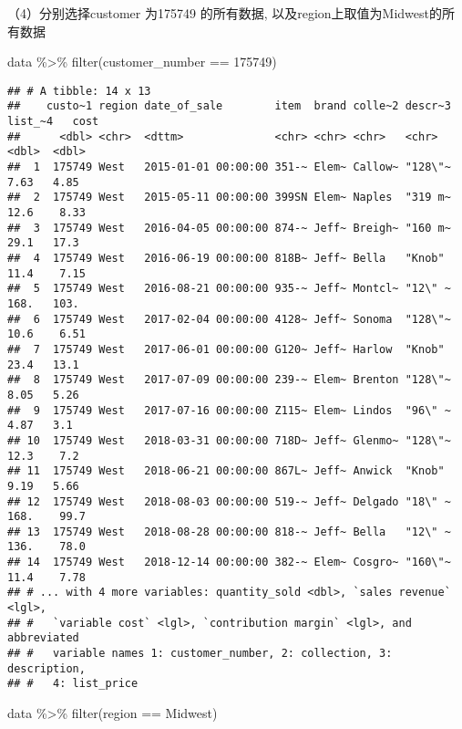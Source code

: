 \documentclass[
]{article}
\newenvironment{Shaded}{\begin{snugshade}}{\end{snugshade}}
\newcommand{\DecValTok}[1]{\textcolor[rgb]{0.00,0.00,0.81}{#1}}
\newcommand{\FunctionTok}[1]{\textcolor[rgb]{0.00,0.00,0.00}{#1}}
\newcommand{\NormalTok}[1]{#1}
\newcommand{\SpecialCharTok}[1]{\textcolor[rgb]{0.00,0.00,0.00}{#1}}
\newcommand{\StringTok}[1]{\textcolor[rgb]{0.31,0.60,0.02}{#1}}
\begin{document}
（4）分别选择customer 为175749 的所有数据,
以及region上取值为Midwest的所有数据

\begin{Shaded}
\begin{Highlighting}[]
\NormalTok{data }\SpecialCharTok{\%\textgreater{}\%}
  \FunctionTok{filter}\NormalTok{(customer\_number }\SpecialCharTok{==} \DecValTok{175749}\NormalTok{)}
\end{Highlighting}
\end{Shaded}

\begin{verbatim}
## # A tibble: 14 x 13
##    custo~1 region date_of_sale        item  brand colle~2 descr~3 list_~4   cost
##      <dbl> <chr>  <dttm>              <chr> <chr> <chr>   <chr>     <dbl>  <dbl>
##  1  175749 West   2015-01-01 00:00:00 351-~ Elem~ Callow~ "128\"~    7.63   4.85
##  2  175749 West   2015-05-11 00:00:00 399SN Elem~ Naples  "319 m~   12.6    8.33
##  3  175749 West   2016-04-05 00:00:00 874-~ Jeff~ Breigh~ "160 m~   29.1   17.3 
##  4  175749 West   2016-06-19 00:00:00 818B~ Jeff~ Bella   "Knob"    11.4    7.15
##  5  175749 West   2016-08-21 00:00:00 935-~ Jeff~ Montcl~ "12\" ~  168.   103.  
##  6  175749 West   2017-02-04 00:00:00 4128~ Jeff~ Sonoma  "128\"~   10.6    6.51
##  7  175749 West   2017-06-01 00:00:00 G120~ Jeff~ Harlow  "Knob"    23.4   13.1 
##  8  175749 West   2017-07-09 00:00:00 239-~ Elem~ Brenton "128\"~    8.05   5.26
##  9  175749 West   2017-07-16 00:00:00 Z115~ Elem~ Lindos  "96\" ~    4.87   3.1 
## 10  175749 West   2018-03-31 00:00:00 718D~ Jeff~ Glenmo~ "128\"~   12.3    7.2 
## 11  175749 West   2018-06-21 00:00:00 867L~ Jeff~ Anwick  "Knob"     9.19   5.66
## 12  175749 West   2018-08-03 00:00:00 519-~ Jeff~ Delgado "18\" ~  168.    99.7 
## 13  175749 West   2018-08-28 00:00:00 818-~ Jeff~ Bella   "12\" ~  136.    78.0 
## 14  175749 West   2018-12-14 00:00:00 382-~ Elem~ Cosgro~ "160\"~   11.4    7.78
## # ... with 4 more variables: quantity_sold <dbl>, `sales revenue` <lgl>,
## #   `variable cost` <lgl>, `contribution margin` <lgl>, and abbreviated
## #   variable names 1: customer_number, 2: collection, 3: description,
## #   4: list_price
\end{verbatim}

\begin{Shaded}
\begin{Highlighting}[]
\NormalTok{data }\SpecialCharTok{\%\textgreater{}\%}
  \FunctionTok{filter}\NormalTok{(region }\SpecialCharTok{==} \StringTok{\textquotesingle{}Midwest\textquotesingle{}}\NormalTok{)}
\end{Highlighting}
\end{Shaded}
\end{document}
